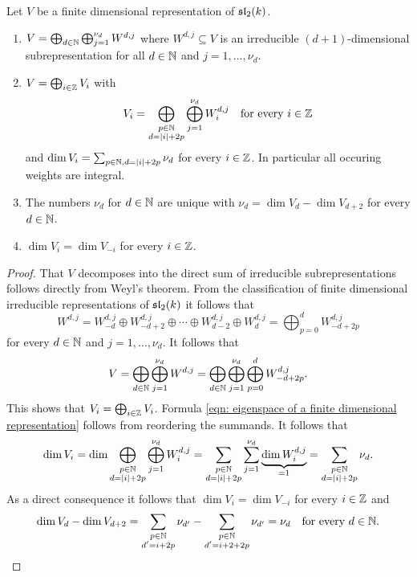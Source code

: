 \begin{thrm}\label{thrm: finite dimensional representations of sl2}
 Let $V$ be a finite dimensional representation of $\mathfrak{sl}_2(k)$.
 \begin{enumerate}[leftmargin=*]
  \item
   $V = \bigoplus_{d \in \mathbb{N}} \bigoplus_{j=1}^{\nu_d} W^{d,j}$ where $W^{d,j} \subseteq V$ is an irreducible $(d+1)$-dimensional subrepresentation for all $d \in \mathbb{N}$ and $j = 1, \dotsc, \nu_d$.
  \item
   $V = \bigoplus_{i \in \mathbb{Z}} V_i$ with
   \begin{equation}\label{eqn: eigenspace of a finite dimensional representation}
    V_i = \bigoplus_{\substack{p \in \mathbb{N} \\ d = |i|+2p}} \bigoplus_{j=1}^{\nu_d} W^{d,j}_i
    \quad \text{for every $i \in \mathbb{Z}$}
   \end{equation}
   and $\dim V_i = \sum_{p \in \mathbb{N}, d = |i|+2p} \nu_d$ for every $i \in \mathbb{Z}$. In particular all occuring weights are integral.
  \item 
   The numbers $\nu_d$ for $d \in \mathbb{N}$ are unique with $\nu_d = \dim V_d - \dim V_{d+2}$ for every $d \in \mathbb{N}$.
  \item
   $\dim V_i = \dim V_{-i}$ for every $i \in \mathbb{Z}$.
 \end{enumerate}
\end{thrm}
\begin{proof}
 That $V$ decomposes into the direct sum of irreducible subrepresentations follows directly from Weyl’s theorem. From the classification of finite dimensional irreducible representations of $\mathfrak{sl}_2(k)$ it follows that
 \[
  W^{d,j}
  = W^{d,j}_{-d} \oplus W^{d,j}_{-d+2} \oplus \dotsb \oplus W^{d,j}_{d-2} \oplus W^{d,j}_d
  = \bigoplus_{p=0}^d W^{d,j}_{-d+2p}
 \]
 for every $d \in \mathbb{N}$ and $j = 1, \dotsc, \nu_d$. It follows that
 \[
  V
  = \bigoplus_{d \in \mathbb{N}} \bigoplus_{j=1}^{\nu_d} W^{d,j}
  = \bigoplus_{d \in \mathbb{N}} \bigoplus_{j=1}^{\nu_d} \bigoplus_{p=0}^d W^{d,j}_{-d+2p}.
 \]
 This shows that $V_i = \bigoplus_{i \in \mathbb{Z}} V_i$. Formula \eqref{eqn: eigenspace of a finite dimensional representation} follows from reordering the summands. It follows that
 \[
  \dim V_i
  = \dim \bigoplus_{\substack{p \in \mathbb{N} \\ d = |i|+2p}} \bigoplus_{j=1}^{\nu_d} W^{d,j}_i
  = \sum_{\substack{p \in \mathbb{N} \\ d = |i|+2p}} \sum_{j=1}^{\nu_d} \underbrace{\dim W^{d,j}_i}_{=1}
  = \sum_{\substack{p \in \mathbb{N} \\ d = |i|+2p}} \nu_d.
 \]
 As a direct consequence it follows that $\dim V_i = \dim V_{-i}$ for every $i \in \mathbb{Z}$ and
 \[
  \dim V_d - \dim V_{d+2}
  = \sum_{\substack{p \in \mathbb{N} \\ d' = i+2p}} \nu_{d'} - \sum_{\substack{p \in \mathbb{N} \\ d' = i+2+2p}} \nu_{d'}
  = \nu_d
  \quad\text{for every $d \in \mathbb{N}$}.
 \qedhere
 \]
\end{proof}






